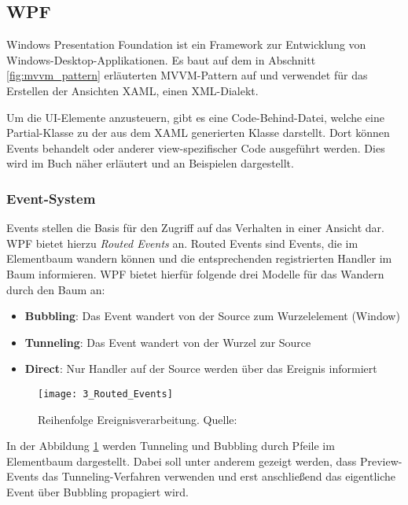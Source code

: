 \subsection{WPF}
\label{subsec:WPF}
Windows Presentation Foundation \cite{microsoft_wpf_overview} ist ein Framework zur Entwicklung von Windows-Desktop-Applikationen. Es baut auf dem in Abschnitt \ref{fig:mvvm_pattern} erläuterten MVVM-Pattern auf und verwendet für das Erstellen der Ansichten XAML, einen XML-Dialekt. 

Um die UI-Elemente anzusteuern, gibt es eine Code-Behind-Datei, welche eine Partial-Klasse zu der aus dem XAML generierten Klasse darstellt. Dort können Events behandelt oder anderer view-spezifischer Code ausgeführt werden. Dies wird im Buch \cite{james2015pro} näher erläutert und an Beispielen dargestellt.

\subsubsection{Event-System}
Events stellen die Basis für den Zugriff auf das Verhalten in einer Ansicht dar. WPF bietet hierzu \emph{Routed Events} \cite{microsoft_wpf_routed_events_overview} an. Routed Events sind Events, die im Elementbaum wandern können und die entsprechenden registrierten Handler im Baum informieren. WPF bietet hierfür folgende drei Modelle für das Wandern durch den Baum an:

\begin{itemize}
    \item \textbf{Bubbling}: Das Event wandert von der Source zum Wurzelelement (Window)
    \item \textbf{Tunneling}: Das Event wandert von der Wurzel zur Source
    \item \textbf{Direct}: Nur Handler auf der Source werden über das Ereignis informiert
\end{itemize}

\begin{figure}[H]
    \centering
    \texttt{[image: 3\_Routed\_Events]}
    \caption{Reihenfolge Ereignisverarbeitung. Quelle: \cite{microsoft_wpf_routed_events_overview}}
    \label{fig:routed_events}
\end{figure}

In der Abbildung \ref{fig:routed_events} werden Tunneling und Bubbling durch Pfeile im Elementbaum dargestellt. Dabei soll unter anderem gezeigt werden, dass Preview-Events das Tunneling-Verfahren verwenden und erst anschließend das eigentliche Event über Bubbling propagiert wird.

